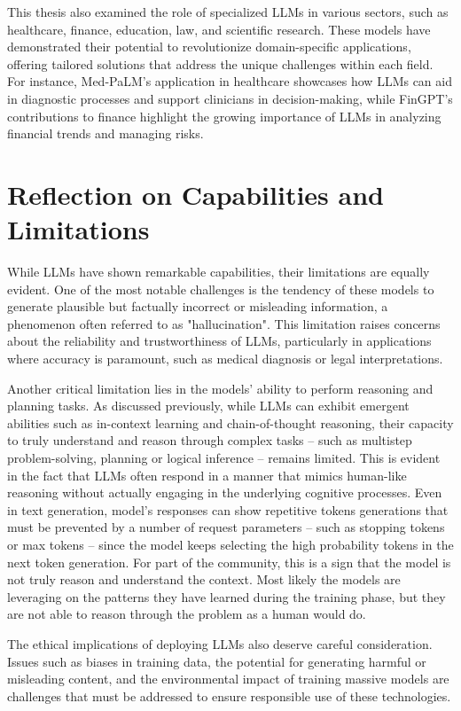 This thesis also examined the role of specialized LLMs in various sectors, such as healthcare, finance, education, law, and scientific research.
These models have demonstrated their potential to revolutionize domain-specific applications, offering tailored solutions that address the unique challenges within each field.
For instance, Med-PaLM's application in healthcare showcases how LLMs can aid in diagnostic processes and support clinicians in decision-making, while FinGPT's contributions to finance highlight the growing importance of LLMs in analyzing financial trends and managing risks.

\section*{Reflection on Capabilities and Limitations}
While LLMs have shown remarkable capabilities, their limitations are equally evident.
One of the most notable challenges is the tendency of these models to generate plausible but factually incorrect or misleading information, a phenomenon often referred to as "hallucination".
This limitation raises concerns about the reliability and trustworthiness of LLMs, particularly in applications where accuracy is paramount, such as medical diagnosis or legal interpretations.

Another critical limitation lies in the models' ability to perform reasoning and planning tasks.
As discussed previously, while LLMs can exhibit emergent abilities such as in-context learning and chain-of-thought reasoning, their capacity to truly understand and reason through complex tasks -- such as multistep problem-solving, planning or logical inference -- remains limited.
This is evident in the fact that LLMs often respond in a manner that mimics human-like reasoning without actually engaging in the underlying cognitive processes.
Even in text generation, model's responses can show repetitive tokens generations that must be prevented by a number of request parameters -- such as stopping tokens or max tokens -- since the model keeps selecting the high probability tokens in the next token generation.
For part of the community, this is a sign that the model is not truly reason and understand the context.
Most likely the models are leveraging on the patterns they have learned during the training phase, but they are not able to reason through the problem as a human would do.

The ethical implications of deploying LLMs also deserve careful consideration.
Issues such as biases in training data, the potential for generating harmful or misleading content, and the environmental impact of training massive models are challenges that must be addressed to ensure responsible use of these technologies.

